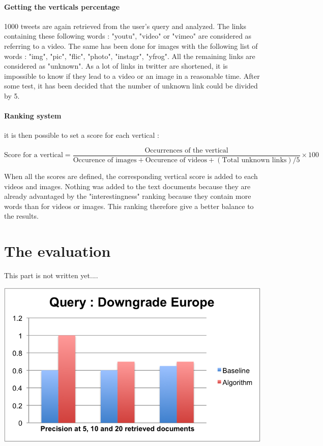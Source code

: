 \documentclass{acmsmall}
\begin{document}
\paragraph{Getting the verticals percentage}
1000 tweets are again retrieved from the user's query and analyzed. The links containing these following words : "youtu", "video" or "vimeo" are considered as referring to a video. The same has been done for images with the following list of words : "img", "pic", "flic", "photo", "instagr", "yfrog". All the remaining links are considered as "unknown". As a lot of links in twitter are shortened, it is impossible to know if they lead to a video or an image in a reasonable time. After some test, it has been decided that the number of unknown link could be divided by 5.

\paragraph{Ranking system}
it is then possible to set a score for each vertical : 

\[ \textrm{Score for a vertical} = \frac{\textrm{Occurrences of the vertical}}{\textrm{Occurence of images} + \textrm{Occurence of videos} + (\textrm{Total unknown links})/ 5} \times 100 \]

When all the scores are defined, the corresponding vertical score is added to each videos and images. Nothing was added to the text documents because they are already advantaged by the "interestingness" ranking because they contain more words than for videos or images. This ranking therefore give a better balance to the results.


\section{The evaluation}

This part is not written yet....


\begin{center}
	\includegraphics[scale=1.00]{downgrade_Europe.png}
\end{center}
\end{document}
